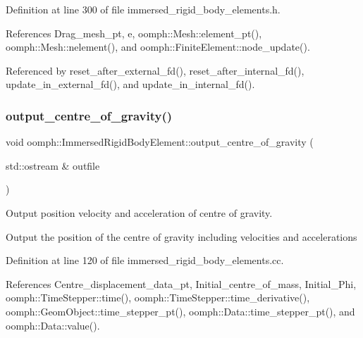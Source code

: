 Definition at line 300 of file immersed\+\_\+rigid\+\_\+body\+\_\+elements.\+h.



References Drag\+\_\+mesh\+\_\+pt, e, oomph\+::\+Mesh\+::element\+\_\+pt(), oomph\+::\+Mesh\+::nelement(), and oomph\+::\+Finite\+Element\+::node\+\_\+update().



Referenced by reset\+\_\+after\+\_\+external\+\_\+fd(), reset\+\_\+after\+\_\+internal\+\_\+fd(), update\+\_\+in\+\_\+external\+\_\+fd(), and update\+\_\+in\+\_\+internal\+\_\+fd().

\mbox{\label{classoomph_1_1ImmersedRigidBodyElement_a7c86fab683bf1d5da2051a09ac210e55}} 
\subsubsection{\texorpdfstring{output\+\_\+centre\+\_\+of\+\_\+gravity()}{output\_centre\_of\_gravity()}}
{\footnotesize\ttfamily void oomph\+::\+Immersed\+Rigid\+Body\+Element\+::output\+\_\+centre\+\_\+of\+\_\+gravity (\begin{DoxyParamCaption}\item[{std\+::ostream \&}]{outfile }\end{DoxyParamCaption})}



Output position velocity and acceleration of centre of gravity. 

Output the position of the centre of gravity including velocities and accelerations 

Definition at line 120 of file immersed\+\_\+rigid\+\_\+body\+\_\+elements.\+cc.



References Centre\+\_\+displacement\+\_\+data\+\_\+pt, Initial\+\_\+centre\+\_\+of\+\_\+mass, Initial\+\_\+\+Phi, oomph\+::\+Time\+Stepper\+::time(), oomph\+::\+Time\+Stepper\+::time\+\_\+derivative(), oomph\+::\+Geom\+Object\+::time\+\_\+stepper\+\_\+pt(), oomph\+::\+Data\+::time\+\_\+stepper\+\_\+pt(), and oomph\+::\+Data\+::value().



